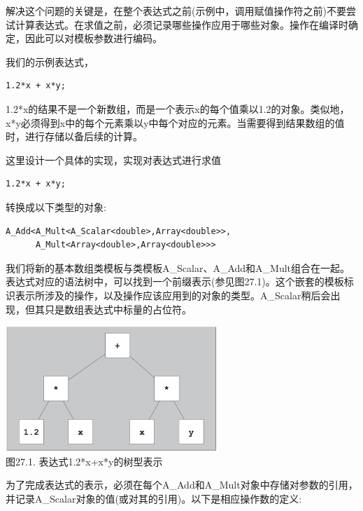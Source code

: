 
解决这个问题的关键是，在整个表达式之前(示例中，调用赋值操作符之前)不要尝试计算表达式。在求值之前，必须记录哪些操作应用于哪些对象。操作在编译时确定，因此可以对模板参数进行编码。

我们的示例表达式，

\begin{lstlisting}[style=styleCXX]
1.2*x + x*y;
\end{lstlisting}

1.2*x的结果不是一个新数组，而是一个表示x的每个值乘以1.2的对象。类似地，x*y必须得到x中的每个元素乘以y中每个对应的元素。当需要得到结果数组的值时，进行存储以备后续的计算。

这里设计一个具体的实现，实现对表达式进行求值

\begin{lstlisting}[style=styleCXX]
1.2*x + x*y;
\end{lstlisting}

转换成以下类型的对象:

\begin{lstlisting}[style=styleCXX]
A_Add<A_Mult<A_Scalar<double>,Array<double>>,
	  A_Mult<Array<double>,Array<double>>>
\end{lstlisting}

我们将新的基本数组类模板与类模板A\_Scalar、A\_Add和A\_Mult组合在一起。表达式对应的语法树中，可以找到一个前缀表示(参见图27.1)。这个嵌套的模板标识表示所涉及的操作，以及操作应该应用到的对象的类型。A\_Scalar稍后会出现，但其只是数组表达式中标量的占位符。

\begin{center}
\includegraphics[width=0.6\textwidth]{content/3/chapter27/images/1.png} \\
图27.1. 表达式1.2*x+x*y的树型表示
\end{center}


为了完成表达式的表示，必须在每个A\_Add和A\_Mult对象中存储对参数的引用，并记录A\_Scalar对象的值(或对其的引用)。以下是相应操作数的定义:

